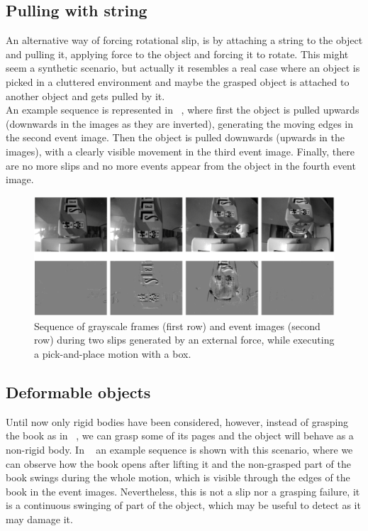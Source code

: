 \subsection{Pulling with string}

An alternative way of forcing rotational slip, is by attaching a string to the object and pulling it, applying force to the object and forcing it to rotate. This might seem a synthetic scenario, but actually it resembles a real case where an object is picked in a cluttered environment and maybe the grasped object is attached to another object and gets pulled by it.\\

An example sequence is represented in ~, where first the object is pulled upwards (downwards in the images as they are inverted), generating the moving edges in the second event image. Then the object is pulled downwards (upwards in the images), with a clearly visible movement in the third event image. Finally, there are no more slips and no more events appear from the object in the fourth event image.

\begin{figure}[H]
    \centering
    \includegraphics[width=\textwidth]{resources/images/init_exp3}
    \caption{Sequence of grayscale frames (first row) and event images (second row) during two slips generated by an external force, while executing a pick-and-place motion with a box.}\label{fig:init_exp3}
\end{figure}

\subsection{Deformable objects}

Until now only rigid bodies have been considered, however, instead of grasping the book as in ~, we can grasp some of its pages and the object will behave as a non-rigid body. In ~ an example sequence is shown with this scenario, where we can observe how the book opens after lifting it and the non-grasped part of the book swings during the whole motion, which is visible through the edges of the book in the event images. Nevertheless, this is not a slip nor a grasping failure, it is a continuous swinging of part of the object, which may be useful to detect as it may damage it.

